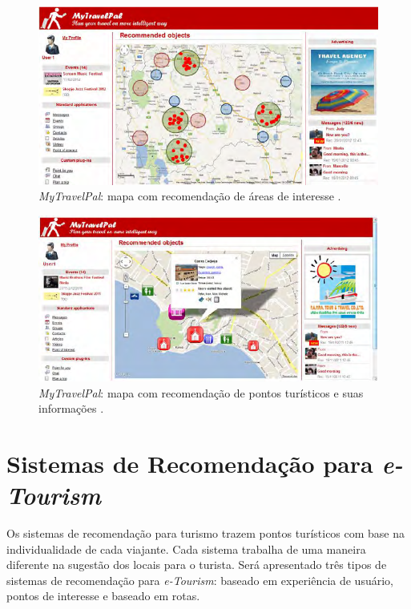 \begin{figure}
	\centering
	\includegraphics[scale=0.7]{images/Figure-no-1-Screenshots-of-the-recommended-municipalities.png}
	\caption{\textit{MyTravelPal}: mapa com recomendação de áreas de interesse \citep{article}.}
	\label{fig:recommended_municipalities}
\end{figure}

\begin{figure}
	\centering
	\includegraphics[scale=0.7]{images/Figure-no-2-Screenshots-of-recommended-tourist-objects.png}
	\caption{\textit{MyTravelPal}: mapa com recomendação de pontos turísticos e suas informações \citep{article}.}
	\label{fig:recommended_tourist_objects}
\end{figure}

\section{Sistemas de Recomendação para \textit{e-Tourism}}
\label{sec:eTourism_recsys}

Os sistemas de recomendação para turismo trazem pontos turísticos com base na individualidade de cada viajante. Cada sistema trabalha de uma maneira diferente na sugestão dos locais para o turista. Será apresentado três tipos de sistemas de recomendação para \textit{e-Tourism}: baseado em experiência de usuário, pontos de interesse e baseado em rotas.

